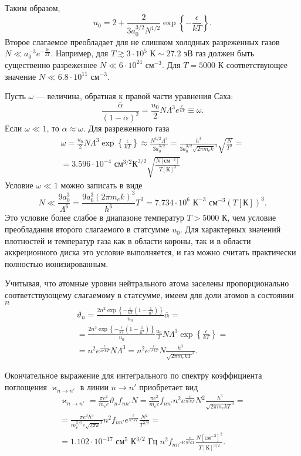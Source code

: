 Таким образом,
\[
u_0 = 2 + \frac{2}{3a_0^{3/2} N^{1/2}} \exp\left\{-\frac{\epsilon}{kT}\right\}.
\]
Второе слагаемое преобладает для не слишком холодных разреженных газов $N \ll a_0^{-3}e^{-\frac{2\epsilon}{kT}}$. Например, для $T \gtrsim 3\cdot 10^5 \text{ К} \sim 27.2 \text{ эВ}$ газ должен быть существенно разреженнее $N \ll 6 \cdot 10^{24} \text { см}^{-3}$. Для $T = 5000 \text{ К}$ соответствующее значение $N \ll 6.8 \cdot 10^{11} \text{ см}^{-3}$.

Пусть $\omega$ --- величина, обратная к правой части уравнения Саха:
\[
\frac{\overline{\alpha}}{(1-\overline{\alpha})^2} = \frac{u_0}{2} N\Lambda^3 e^{\frac{\epsilon}{kT}} \equiv \omega.
\]
Если $\omega \ll 1$, то $\overline{\alpha} \approx \omega$. Для разреженного газа
\begin{multline*}
\omega = \frac{u_0}{2} N\Lambda^3 \exp\left\{\frac{\epsilon}{kT}\right\} \approx
\frac{N^{1/2} \Lambda^3}{3a_0^{3/2}} 
= \frac{h^3}{3a_0^{3/2}\sqrt{2\pi m_e k}^3} \sqrt{\frac{N}{T^3}} = \\
= 3.596\cdot 10^{-4} \text{ см}^{3/2}\text{К}^{3/2} \sqrt{\frac{N [\text{см}^{-3}]}{T [\text{К}]^3}}
\end{multline*}
Условие $\omega \ll 1$ можно записать в виде
\[
N \ll \frac{9a_0^3}{\Lambda^6} = \frac{9a_0^3 (2\pi m_e k)^3}{h^6} T^3 = 7.734 \cdot 10^6 \text{ К}^{-3} \text{ см}^{-3} (T [\text{К}])^3.
\]
Это условие более слабое в диапазоне температур $T > 5000 \text{ К}$, чем условие преобладания второго слагаемого в статсумме $u_0$. Для характерных значений плотностей и температур газа как в области короны, так и в области аккреционного диска это условие выполняется, и газ можно считать практически полностью ионизированным.

Учитывая, что атомные уровни нейтрального атома заселены пропорционально соответствующему слагаемому в статсумме, имеем для доли атомов в состоянии $n$
\begin{multline*}
\vartheta_n = \frac{2n^2\exp\left\{-\frac{\epsilon}{kT}\left(1 - \frac{1}{n^2}\right)\right\}}{u_0} \overline{\alpha} = \\ =
\frac{2n^2\exp\left\{-\frac{\epsilon}{kT}\left(1 - \frac{1}{n^2}\right)\right\}}{u_0}\frac{u_0}{2} N\Lambda^3 \exp\left\{\frac{\epsilon}{kT}\right\} = \\ =
n^2e^\frac{\epsilon}{n^2kT} N\Lambda^3 = 
n^2e^\frac{\epsilon}{n^2kT} N\frac{h^3}{\sqrt{2\pi m_e kT}^3}.
\end{multline*}

Окончательное выражение для интегрального по спектру коэффициента поглощения $\varkappa_{n \to n'}$ в линии $n \to n'$ приобретает вид
\begin{multline*}
\varkappa_{n \to n'} = \frac{\pi e^2}{m_ec} \vartheta_n f_{nn'} N = 
\frac{\pi e^2}{m_ec} f_{nn'} n^2e^\frac{\epsilon}{n^2kT} N^2\frac{h^3}{\sqrt{2\pi m_e kT}^3} = \\
= \frac{\pi e^2 h^3}{m_e^{5/2} c\sqrt{2\pi k}^3} n^2f_{nn'} e^\frac{\epsilon}{n^2kT} \frac{N^2}{T^{3/2}} = \\ =
1.102\cdot 10^{-17} \text{ см}^5 \text{ К}^{3/2} \text{ Гц } n^2f_{nn'} e^\frac{\epsilon}{n^2kT} \frac{N [\text{см}^{-3}]^2}{T[\text{К}]^{3/2}}.
\end{multline*}

